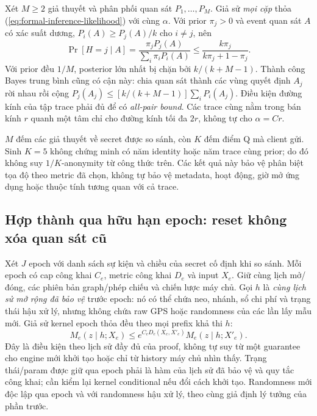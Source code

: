 Xét $M\geq2$ giả thuyết và phân phối quan sát $P_1,\ldots,P_M$.
Giả sử \emph{mọi cặp} thỏa (\ref{eq:formal-inference-likelihood}) với
cùng $\alpha$. Với prior $\pi_j>0$ và event quan sát $A$ có xác suất
dương, $P_i(A)\geq P_j(A)/k$ cho $i\ne j$, nên
\begin{equation}
 \Pr[H=j\mid A]
 =\frac{\pi_jP_j(A)}{\sum_i\pi_iP_i(A)}
 \leq\frac{k\pi_j}{k\pi_j+1-\pi_j}.
 \label{eq:formal-inference-multi-posterior}
\end{equation}
Với prior đều $1/M$, posterior lớn nhất bị chặn bởi $k/(k+M-1)$.
Thành công Bayes trung bình cũng có cận này: chia quan sát thành các vùng
quyết định $A_j$ rời nhau rồi cộng
$P_j(A_j)\leq[k/(k+M-1)]\sum_iP_i(A_j)$.
Điều kiện đường kính của tập trace phải đủ để có \emph{all-pair bound}. Các trace
cùng nằm trong bán kính $r$ quanh một tâm chỉ cho đường kính tối đa $2r$,
không tự cho $\alpha=Cr$.

$M$ đếm các giả thuyết về secret được so sánh, còn $K$ đếm điểm Q mà
client gửi. Sinh $K=5$ không chứng minh có năm identity hoặc năm trace
cùng prior; do đó không suy $1/K$-anonymity từ công thức trên. Các kết quả
này bảo vệ phân biệt tọa độ theo metric đã chọn, không tự bảo vệ metadata,
hoạt động, giờ mở ứng dụng hoặc thuộc tính tương quan với cả trace.

\subsection{Hợp thành qua hữu hạn epoch: reset không xóa quan sát cũ}
\label{sec:formal-inference-epochs}

Xét $J$ epoch với danh sách sự kiện và chiều của secret cố định khi so
sánh. Mỗi epoch có cap công khai $C_e$, metric công khai $D_e$ và input
$X_e$. Giữ cùng lịch mở/đóng, các phiên bản graph/phép chiếu và chiến
lược máy chủ. Gọi $h$ là \emph{cùng lịch sử mở rộng đã bảo vệ} trước epoch:
nó có thể chứa neo, nhánh, sổ chi phí và trạng thái hậu xử lý, nhưng không
chứa raw GPS hoặc randomness của các lần lấy mẫu mới. Giả sử kernel epoch
thỏa đều theo mọi prefix khả thi $h$:
\begin{equation}
 M_e(z\mid h;X_e)
 \leq e^{C_eD_e(X_e,X'_e)}M_e(z\mid h;X'_e).
 \label{eq:formal-inference-epoch-conditional}
\end{equation}
Đây là điều kiện theo lịch sử đầy đủ của proof, không tự suy từ một
guarantee cho engine mới khởi tạo hoặc chỉ từ history máy chủ nhìn thấy.
Trạng thái/param được giữ qua epoch phải là hàm của lịch sử đã bảo vệ và
quy tắc công khai; cần kiểm lại kernel conditional nếu đổi cách khởi tạo.
Randomness mới độc lập qua epoch và với randomness hậu xử lý, theo cùng
giả định lý tưởng của phần trước.

